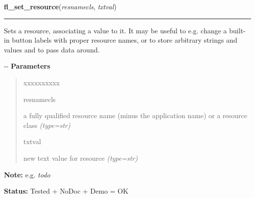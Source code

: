 \hspace{.8\funcindent}\begin{boxedminipage}{\funcwidth}

    \raggedright \textbf{fl\_set\_resource}(\textit{resnamecls}, \textit{txtval})

    \vspace{-1.5ex}

    \rule{\textwidth}{0.5\fboxrule}
\setlength{\parskip}{2ex}

Sets a resource, associating a value to it. It may be useful to e.g.
change a built-in button labels with proper resource names, or to store
arbitrary strings and values and to pass data around.

-{}-
\setlength{\parskip}{1ex}
      \textbf{Parameters}
      \vspace{-1ex}

      \begin{quote}
        \begin{Ventry}{xxxxxxxxxx}

          \item[resnamecls]


a fully qualified resource name (minus the application name) or a
resource class
            {\it (type=str)}

          \item[txtval]


new text value for resource
            {\it (type=str)}

        \end{Ventry}

      \end{quote}

\textbf{Note:} 
e.g. \emph{todo}


\textbf{Status:} 
Tested + NoDoc + Demo = OK


    \end{boxedminipage}

    \label{xformslib:flxbasic:fl_get_app_resources}

    \vspace{0.5ex}

